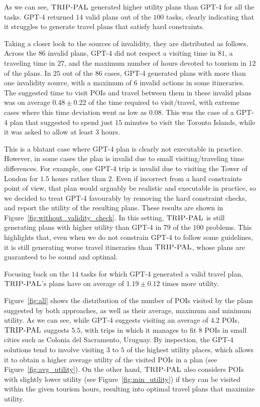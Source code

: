 \documentclass[letterpaper]{article}
\newcommand{\gpt}{{\sc GPT-4}\xspace}
\newcommand{\approach}{\ensuremath{\textsc{TRIP-PAL}}\xspace}
\begin{document}
As we can see, \approach generated higher utility plans than \gpt for all the tasks.
\gpt returned $14$ valid plans out of the $100$ tasks, clearly indicating that it struggles to generate travel plans that satisfy hard constraints.

Taking a closer look to the sources of invalidity, they are distributed as follows.
Across the $86$ invalid plans, \gpt did not respect a visiting time in $81$, a traveling time in $27$, and the maximum number of hours devoted to tourism in $12$ of the plans.
In $25$ out of the $86$ cases, \gpt generated plans with more than one invalidity source, with a maximum of $6$ invalid actions in some itineraries.
The suggested time to visit POIs and travel between them in these invalid plans was on average $0.48\pm0.22$ of the time required to visit/travel, with extreme cases where this time deviation went as low as $0.08$.
This was the case of a \gpt plan that suggested to spend just $15$ minutes to visit the Toronto Islands, while it was asked to allow at least $3$ hours.


This is a blatant case where \gpt plan is clearly not executable in practice.
However, in some cases the plan is invalid due to small visiting/traveling time differences.
For example, one \gpt trip is invalid due to visiting the Tower of London for $1.5$ hours rather than $2$. 
Even if incorrect from a hard constraints point of view, that plan would arguably be realistic and executable in practice, so we decided to treat \gpt favourably by removing the hard constraint checks, and report the utility of the resulting plans.
These results are shown in Figure~\ref{fig:without_validity_check}.
In this setting, \approach is still generating plans with higher utility than \gpt in $79$ of the $100$ problems.
This highlights that, even when we do not constrain \gpt to follow some guidelines, it is still generating worse travel itineraries than \approach, whose plans are guaranteed to be sound and optimal.


Focusing back on the $14$ tasks for which \gpt generated a valid travel plan, \approach's plans have on average of $1.19\pm0.12$ times more utility.

Figure~\ref{fig:all} shows the distribution of the number of POIs visited by the plans suggested by both approaches, as well as their average, maximum and minimum utility.
As we can see, while \gpt suggests visiting an average of $4.2$ POIs, \approach suggests $5.5$, with trips in which it manages to fit $8$ POIs in small cities such as Colonia del Sacramento, Uruguay.
By inspection, the \gpt solutions tend to involve visiting $3$ to $5$ of the highest utility places, which allows it to obtain a higher average utility of the visited POIs in a plan (see Figure~\ref{fig:avg_utility}).
On the other hand, \approach also considers POIs with slightly lower utility (see Figure~\ref{fig:min_utility}) if they can be visited within the given tourism hours, resulting into optimal travel plans that maximize utility.
\end{document}
